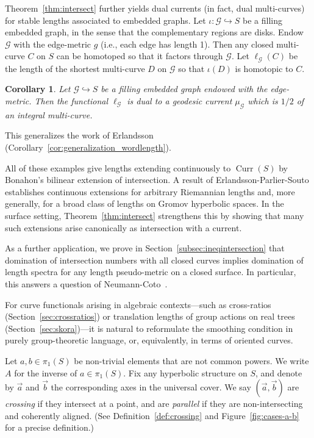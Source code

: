 \documentclass[11pt]{amsart}
\newcommand{\ora}[1]{\overrightarrow{#1}}
\numberwithin{equation}{section}
\numberwithin{figure}{section}
\newtheorem{maincor}[mainthm]{Corollary}
\theoremstyle{definition}
\theoremstyle{plain}
\DeclareMathOperator{\Curr}{Curr}
\begin{document}
Theorem~\ref{thm:intersect} further yields dual currents (in fact, dual multi-curves) for stable
lengths associated to embedded graphs. Let $\iota \colon \mathcal{G}
\hookrightarrow S$ be a filling embedded graph, in the sense that the complementary
regions are disks. 
Endow $\mathcal{G}$ with the edge-metric $g$ (i.e., each edge has
length 1). Then any closed multi-curve $C$ on $S$ can be homotoped so
that it factors through $\mathcal{G}$.
 Let $\ell_{\mathcal{G}}(C)$ be the length of the shortest multi-curve
 $D$ on $\mathcal{G}$ so that $\iota(D)$ is homotopic to $C$.

\begin{maincor}
Let $\mathcal{G} \hookrightarrow S$ be a filling embedded graph endowed with the edge-metric. Then
the functional $\ell_{\mathcal{G}}$ is dual to a
geodesic current $\mu_{\mathcal{G}}$ which is $1/2$ of an integral
multi-curve.
\label{maincor:embedded}
\end{maincor}

This generalizes the work of Erlandsson~\cite{Erlandsson:WordLength} (Corollary~\ref{cor:generalization_wordlength}).

All of these examples give lengths extending continuously to $\Curr(S)$
by Bonahon’s bilinear extension of intersection. A result
of Erlandsson-Parlier-Souto \cite[Theorem~1.5]{EPS20:CountingCurves}
establishes continuous
extensions for arbitrary Riemannian lengths and, more generally, for a
broad class of lengths on Gromov hyperbolic spaces. In the surface
setting, Theorem~\ref{thm:intersect} strengthens this by showing that
many such extensions arise canonically as intersection with a current.
    
    As a further application, we prove in
    Section~\ref{subsec:ineqintersection} that domination of
    intersection numbers with all closed curves implies domination of
    length spectra for any length pseudo-metric on a closed surface. In
    particular, this answers a question of
    Neumann-Coto~\cite[p.\ 368]{NC01:ShortestGeodesics}.

    For curve functionals arising in algebraic contexts---such as
    cross-ratios (Section~\ref{sec:crossratios}) or translation
    lengths of group actions on real trees
    (Section~\ref{sec:skora})---it is natural to reformulate the
    smoothing condition in purely group-theoretic language, or, equivalently, in terms of
    oriented curves.

    Let $a,b \in \pi_1(S)$ be non-trivial elements that are not common
    powers. We write $A$ for the inverse of $a \in \pi_1(S)$. Fix any
    hyperbolic structure on $S$, and denote by $\ora{a}$ and $\ora{b}$
    the corresponding axes in the universal cover. We say $(\ora{a}, \ora{b})$ are \emph{crossing} if they intersect at a point, and are \emph{parallel} if they are non-intersecting and coherently aligned. (See
Definition~\ref{def:crossing} and
    Figure~\ref{fig:cases-a-b} for a precise definition.)
\end{document}
